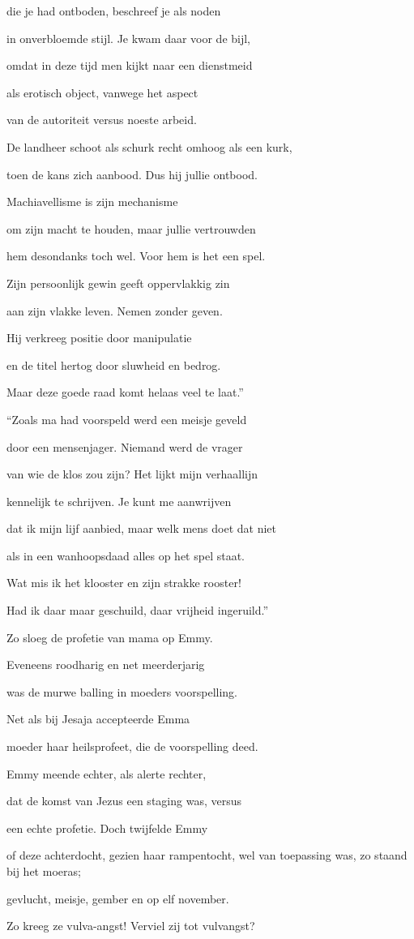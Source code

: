 die je had ontboden,
beschreef je als noden

in onverbloemde stijl.
Je kwam daar voor de bijl,

omdat in deze tijd
men kijkt naar een dienstmeid

als erotisch object,
vanwege het aspect

van de autoriteit
versus noeste arbeid.

De landheer schoot als schurk
recht omhoog als een kurk,

toen de kans zich aanbood.
Dus hij jullie ontbood.

Machiavellisme
is zijn mechanisme

om zijn macht te houden,
maar jullie vertrouwden

hem desondanks toch wel.
Voor hem is het een spel.

Zijn persoonlijk gewin
geeft oppervlakkig zin

aan zijn vlakke leven.
Nemen zonder geven.

Hij verkreeg positie
door manipulatie

en de titel hertog
door sluwheid en bedrog.

Maar deze goede raad
komt helaas veel te laat.”

“Zoals ma had voorspeld
werd een meisje geveld

door een mensenjager.
Niemand werd de vrager

van wie de klos zou zijn?
Het lijkt mijn verhaallijn

kennelijk te schrijven.
Je kunt me aanwrijven

dat ik mijn lijf aanbied,
maar welk mens doet dat niet

als in een wanhoopsdaad
alles op het spel staat.

Wat mis ik het klooster
en zijn strakke rooster!

Had ik daar maar geschuild,
daar vrijheid ingeruild.”

Zo sloeg de profetie
van mama op Emmy.

Eveneens roodharig
en net meerderjarig

was de murwe balling
in moeders voorspelling.

Net als bij Jesaja
accepteerde Emma

moeder haar heilsprofeet,
die de voorspelling deed.

Emmy meende echter,
als alerte rechter,

dat de komst van Jezus
een staging was, versus

een echte profetie.
Doch twijfelde Emmy

of deze achterdocht,
gezien haar rampentocht,
wel van toepassing was,
zo staand bij het moeras;

gevlucht, meisje, gember
en op elf november.

Zo kreeg ze vulva-angst!
Verviel zij tot vulvangst?
